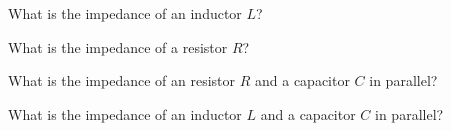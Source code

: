 \begin{enumerate}
\qitem What is the impedance of an inductor $L$?

\ws{\vspace{30px}}



\qitem What is the impedance of a resistor $R$?

\ws{\vspace{30px}}



\qitem What is the impedance of an resistor $R$ and a capacitor $C$ in parallel?

\ws{\vspace{30px}}


\qitem What is the impedance of an inductor $L$ and a capacitor $C$ in parallel?

\ws{\vspace{30px}}





\end{enumerate}
